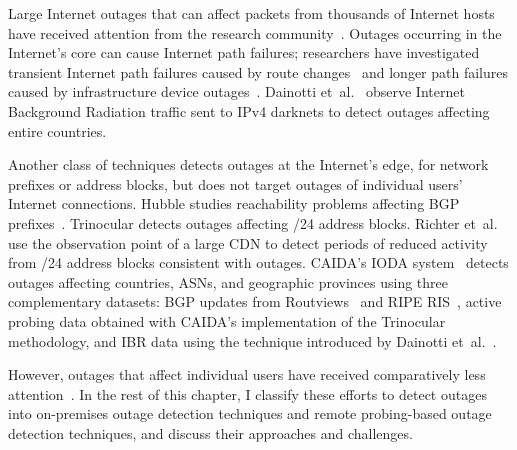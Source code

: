 Large Internet outages that can affect packets from thousands of
Internet hosts have received attention from the research
community~\cite{censorship-outages, trinocular, hubble, paxson-e2e,
hubble, netdiagnoser, lifeguard, poiroot,
phillipa-outages-mailing-list, california-fault-lines,
delayed-routing-convergence, consensus-routing, routing-e2e-path-perf,
voip-bgp-convergence}. Outages occurring in the Internet's core can
cause Internet path failures; researchers have investigated transient
Internet path failures caused by route
changes~\cite{delayed-routing-convergence, consensus-routing,
routing-e2e-path-perf, voip-bgp-convergence} and longer path failures
caused by infrastructure device outages~\cite{paxson-e2e, hubble,
netdiagnoser, lifeguard, poiroot, phillipa-outages-mailing-list,
california-fault-lines}. Dainotti et~al.~\cite{dainotti-imc11} observe
Internet Background Radiation traffic sent to IPv4 darknets to detect
outages affecting entire countries.


Another class of techniques detects outages at the Internet's edge,
for network prefixes or address blocks, but
does not target outages of individual users' Internet
connections. Hubble studies reachability problems affecting BGP
prefixes~\cite{hubble}. Trinocular detects outages affecting /24
address blocks. Richter
et~al.~\cite{advancing-outage-art} use the observation point of a
large CDN to detect periods of reduced activity from /24 address
blocks consistent with outages. CAIDA's IODA
system~\cite{ioda-project-page} detects outages affecting countries, ASNs, and geographic provinces using three complementary
datasets: BGP updates from Routviews~\cite{routeviews} and RIPE RIS~\cite{ripe-ris}, active probing data
obtained with CAIDA's implementation of the Trinocular methodology,
and IBR data using the technique introduced by Dainotti et~al.~\cite{dainotti-imc11}. 


However, outages that affect individual users have received comparatively less
attention~\cite{pingin, grover2013peeking, disco, alwayson}. In the rest of this
chapter, I classify these efforts to detect outages into on-premises
outage detection techniques and remote probing-based outage detection
techniques, and
discuss their approaches and challenges.


